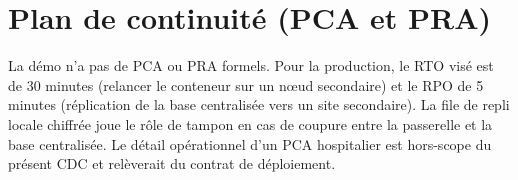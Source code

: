 \section{Plan de continuité (PCA et PRA)}
\label{sec:deploiement-pca-pra}

La démo n'a pas de PCA ou PRA formels. Pour la production, le RTO visé est de 30 minutes (relancer le conteneur sur un nœud secondaire) et le RPO de 5 minutes (réplication de la base centralisée vers un site secondaire). La file de repli locale chiffrée joue le rôle de tampon en cas de coupure entre la passerelle et la base centralisée. Le détail opérationnel d'un PCA hospitalier est hors-scope du présent CDC et relèverait du contrat de déploiement.

